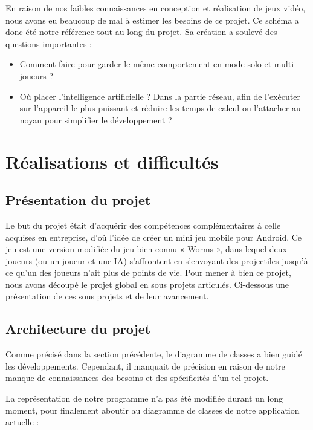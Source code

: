 \documentclass{report}
\begin{document}
En raison de nos faibles connaissances en conception et réalisation de
jeux vidéo, nous avons eu beaucoup de mal à estimer les besoins de ce
projet. Ce schéma a donc été notre référence tout au long du projet. Sa
création a soulevé des questions importantes :

\begin{itemize}
\item Comment faire pour garder le même comportement en mode solo et
multi-joueurs ?
\item Où placer l’intelligence artificielle ? Dans la partie réseau,
afin de l’exécuter sur l’appareil le plus puissant et réduire les temps
de calcul ou l’attacher au noyau pour simplifier le développement ?
\end{itemize}

\newpage

\section{Réalisations et difficultés}
\bigskip


\subsection{Présentation du projet}
\bigskip


Le but du projet était d'acquérir des compétences complémentaires à
celle acquises en entreprise, d’où l’idée de créer un mini jeu mobile
pour Android. Ce jeu est une version modifiée du jeu bien connu « Worms »,
dans lequel deux joueurs (ou un joueur et une IA) s’affrontent en
s’envoyant des projectiles jusqu’à ce qu’un des joueurs n’ait plus de
points de vie.
Pour mener à bien ce projet, nous avons découpé le projet global en
sous projets articulés. Ci-dessous une présentation de ces sous projets
et de leur avancement.

\subsection{Architecture du projet}
\bigskip


Comme précisé dans la section précédente, le diagramme de classes a bien
guidé les développements. Cependant, il manquait de précision en raison
de notre manque de connaissances des besoins et des spécificités d’un
tel projet.

La représentation de notre programme n’a pas été modifiée durant un
long moment, pour finalement aboutir au diagramme de classes de notre
application actuelle :
\end{document}
